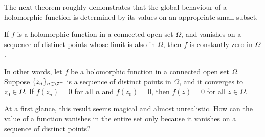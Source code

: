 \documentclass[thmcnt=section, color=cyan, 12pt]{my-elegantbook}
\begin{document}
The next theorem roughly demonstrates that the global behaviour of a holomorphic function is determined by its values on an appropriate small subset.

\begin{theorem}
	If $f$ is a holomorphic function in a connected open set $\Omega$, and vanishes on a sequence of distinct points whose limit is also in $\Omega$, then $f$ is constantly zero in $\Omega$.

	In other words, let $f$ be a holomorphic function in a connected open set $\Omega$.
	Suppose $\{z_n\}_{n \in \Z^+}$ is a sequence of distinct points in $\Omega$, and it converges to $z_0 \in \Omega$. If $f(z_n) = 0$ for all $n$ and $f(z_0) = 0$, then $f(z) = 0$ for all $z \in \Omega$.
\end{theorem}

At a first glance, this result seems magical and almost unrealistic.
How can the value of a function vanishes in the entire set only because it vanishes on a sequence of distinct points?
\end{document}
